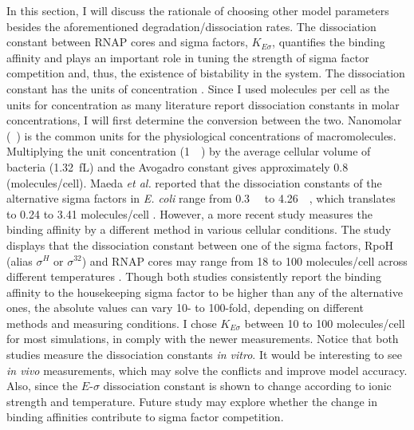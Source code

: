 In this section, I will discuss the rationale of choosing other
model parameters besides the aforementioned degradation/dissociation
rates.
The dissociation constant between RNAP cores and sigma factors,
$K_{E\sigma}$, quantifies the binding affinity and plays an important
role in tuning the strength of sigma factor competition and,
thus, the existence of bistability in the system.
The dissociation constant has the units of concentration
\cite{alon06}.
Since I used molecules per cell as the units for concentration
as many literature report dissociation constants in 
molar concentrations,
I will first determine the conversion between the two.
Nanomolar (\si{\nano\Molar}) is the common units for the 
physiological concentrations of macromolecules.
Multiplying the unit concentration (\SI{1}{\nano\Molar}) by the average cellular
volume of bacteria (\SI{1.32}{\femto\liter}) \cite{mauri14} and the
Avogadro constant gives approximately 0.8 (molecules/cell).
Maeda \textit{et al.} reported that the dissociation constants
of the alternative sigma factors in \textit{E. coli} range from
\SI{0.3}{\nano\Molar} to \SI{4.26}{\nano\Molar}, which translates to
0.24 to 3.41 molecules/cell \cite{maeda00}.
However, a more recent study measures the binding affinity
by a different method in various cellular conditions.
The study displays that the dissociation constant
between one of the sigma factors, RpoH (alias $\sigma^H$ or $\sigma^{32}$) 
and RNAP cores
may range from 18 to 100 molecules/cell across different temperatures 
\cite{ganguly12}.
Though both studies consistently report the binding affinity to
the housekeeping sigma factor to be higher than any of the alternative
ones, the absolute values can vary 10- to 100-fold, depending on
different methods and measuring conditions.
I chose $K_{E\sigma}$ between 10 to 100 molecules/cell for most simulations,
in comply with the newer measurements.
Notice that both studies measure the dissociation constants 
\textit{in vitro}. It would be interesting to see \textit{in vivo}
measurements, which may solve the conflicts and improve model accuracy.
Also, since the $E$-$\sigma$ dissociation constant is shown to
change according to ionic strength and temperature.
Future study may explore whether the change in binding affinities
contribute to sigma factor competition.

